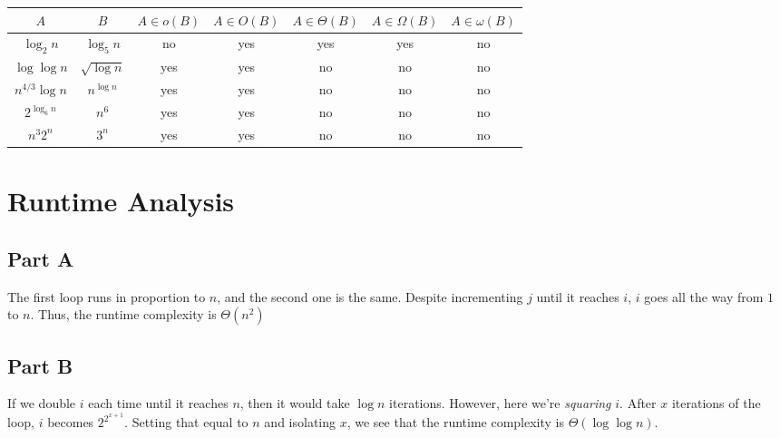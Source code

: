 \documentclass[12pt]{article}
\begin{document}
\begin{table}[H]
    \centering
    \begin{tabular}{|c|c|c|c|c|c|c|}
        \hline
        $A$              & $B$             & $A \in o(B)$ & $A \in O(B)$ & $A \in \Theta(B)$ & $A \in \Omega(B)$ & $A \in \omega(B)$ \\
        \hline
        $\log_2 n$       & $\log_5 n$      & no           & yes          & yes               & yes               & no                \\
        \hline
        $\log \log n$    & $\sqrt{\log n}$ & yes          & yes          & no                & no                & no                \\
        \hline
        $n^{4/3} \log n$ & $n^{\log n}$    & yes          & yes          & no                & no                & no                \\
        \hline
        $2^{\log_6 n}$   & $n^6$           & yes          & yes          & no                & no                & no                \\
        \hline
        $n^3 2^n$        & $3^n$           & yes          & yes          & no                & no                & no                \\
        \hline
    \end{tabular}
\end{table}


\section{Runtime Analysis}

\subsection*{Part A}

The first loop runs in proportion to $n$, and the second one is the same.
Despite incrementing $j$ until it reaches $i$, $i$ goes all the way from $1$ to $n$.
Thus, the runtime complexity is $\Theta(n^2)$

\subsection*{Part B}

If we double $i$ each time until it reaches $n$, then it would take $\log n$ iterations.
However, here we're \textit{squaring} $i$.
After $x$ iterations of the loop, $i$ becomes $2^{2^{x+1}}$.
Setting that equal to $n$ and isolating $x$, we see that the runtime
complexity is $\Theta(\log \log n)$.
\end{document}
